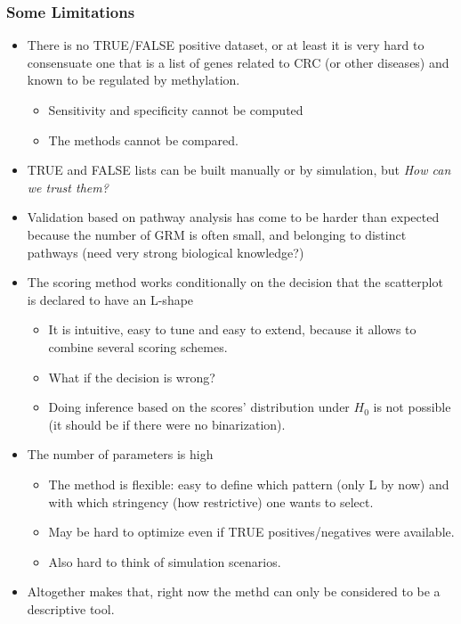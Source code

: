 \documentclass[handout]{beamer}
\begin{document}
\begin{frame}[allowframebreaks]
	\frametitle{Some Limitations}
 \begin{itemize}
	\item There is no TRUE/FALSE positive dataset, or at least it is very hard to consensuate one that is a list of genes related to CRC (or other diseases) and known to be regulated by methylation.
	\begin{itemize}
		\item Sensitivity and specificity cannot be computed
		\item The methods cannot be compared.
	\end{itemize}
    \item TRUE and FALSE lists can be built manually or by simulation, but \emph{How can we trust them?}
    \item Validation based on pathway analysis has come to be harder than expected because the number of GRM is often small, and belonging to distinct pathways (need very strong biological knowledge?)
\framebreak 
	\item The scoring method works conditionally on the decision that the scatterplot is declared to have an L-shape
			\begin{itemize}
			\item It is intuitive, easy to tune and easy to extend, because it allows to combine several scoring schemes.
			\item What if the decision is wrong?
			\item Doing inference based on the scores' distribution under $H_0$ is not possible (it should be if there were no binarization).
		\end{itemize}
	\item The number of parameters is high
		\begin{itemize}
			\item The method is flexible: easy to define which pattern (only L by now) and with which stringency (how restrictive) one wants to select.
			\item May be hard to optimize even if TRUE positives/negatives were available.
			\item Also hard to think of simulation scenarios.
		\end{itemize}

\item Altogether makes that, right now the methd can only be considered to be a descriptive tool.

\end{itemize} 	
\end{frame}
\end{document}

